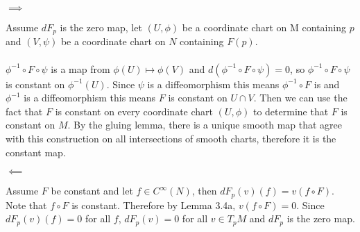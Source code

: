 $\implies$

Assume $dF_p$ is the zero map, let $(U,\phi)$ be a coordinate chart on M containing $p$ and $(V,\psi)$ be a coordinate chart on $N$ containing $F(p)$.
\\\\
$\phi^{-1} \circ F \circ \psi$ is a map from $\phi(U) \mapsto \phi(V)$ and $d(\phi^{-1} \circ F \circ \psi) = 0$, so $\phi^{-1} \circ F \circ \psi$ is constant on $\phi^{-1}(U)$. Since $\psi$ is a diffeomorphism this means $\phi^{-1} \circ F$ is and $\phi^{-1}$ is a diffeomorphism this means $F$ is constant on $U\cap V$.  Then we can use the fact that $F$ is constant on every coordinate chart $(U, \phi)$ to determine that $F$ is constant on $M$. By the gluing lemma, there is a unique smooth map that agree with this construction on all intersections of smooth charts, therefore it is the constant map.

$\impliedby$

Assume $F$ be constant and let $f \in C^\infty(N)$, then $dF_p(v)(f) = v(f\circ F)$.  Note that $f \circ F$ is constant.  Therefore by Lemma 3.4a, $v(f\circ F) = 0$.  Since $dF_p(v)(f) = 0$ for all $f$, $dF_p(v) = 0$ for all $v \in T_pM$ and $dF_p$ is the zero map.    